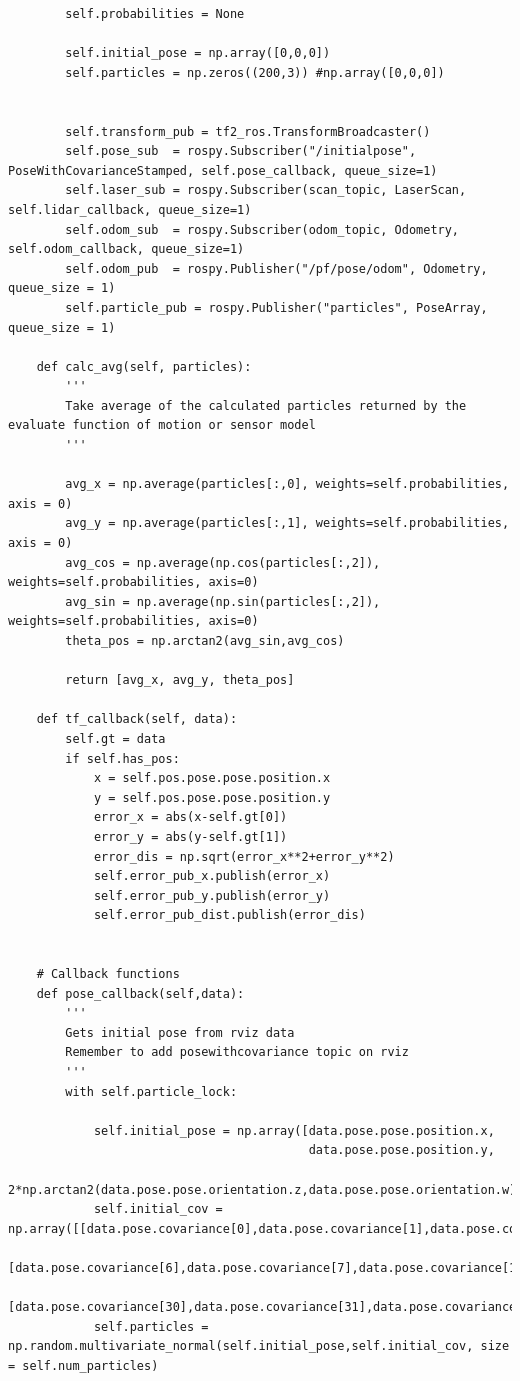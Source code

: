 \documentclass{article}
\begin{document}
{\begin{verbatim}
        self.probabilities = None

        self.initial_pose = np.array([0,0,0])
        self.particles = np.zeros((200,3)) #np.array([0,0,0])


        self.transform_pub = tf2_ros.TransformBroadcaster()
        self.pose_sub  = rospy.Subscriber("/initialpose", PoseWithCovarianceStamped, self.pose_callback, queue_size=1)
        self.laser_sub = rospy.Subscriber(scan_topic, LaserScan, self.lidar_callback, queue_size=1)
        self.odom_sub  = rospy.Subscriber(odom_topic, Odometry, self.odom_callback, queue_size=1)
        self.odom_pub  = rospy.Publisher("/pf/pose/odom", Odometry, queue_size = 1)
        self.particle_pub = rospy.Publisher("particles", PoseArray, queue_size = 1)

    def calc_avg(self, particles):
        '''
        Take average of the calculated particles returned by the evaluate function of motion or sensor model
        '''

        avg_x = np.average(particles[:,0], weights=self.probabilities, axis = 0)
        avg_y = np.average(particles[:,1], weights=self.probabilities, axis = 0)
        avg_cos = np.average(np.cos(particles[:,2]), weights=self.probabilities, axis=0)
        avg_sin = np.average(np.sin(particles[:,2]), weights=self.probabilities, axis=0)
        theta_pos = np.arctan2(avg_sin,avg_cos)

        return [avg_x, avg_y, theta_pos]
    
    def tf_callback(self, data):
        self.gt = data
        if self.has_pos:
            x = self.pos.pose.pose.position.x
            y = self.pos.pose.pose.position.y
            error_x = abs(x-self.gt[0])
            error_y = abs(y-self.gt[1])
            error_dis = np.sqrt(error_x**2+error_y**2)
            self.error_pub_x.publish(error_x)
            self.error_pub_y.publish(error_y)
            self.error_pub_dist.publish(error_dis)


    # Callback functions
    def pose_callback(self,data):
        '''
        Gets initial pose from rviz data
        Remember to add posewithcovariance topic on rviz
        '''
        with self.particle_lock:

            self.initial_pose = np.array([data.pose.pose.position.x,
                                          data.pose.pose.position.y,
                                          2*np.arctan2(data.pose.pose.orientation.z,data.pose.pose.orientation.w)])
            self.initial_cov = np.array([[data.pose.covariance[0],data.pose.covariance[1],data.pose.covariance[5]],
                                         [data.pose.covariance[6],data.pose.covariance[7],data.pose.covariance[11]],
                                         [data.pose.covariance[30],data.pose.covariance[31],data.pose.covariance[35]]])
            self.particles = np.random.multivariate_normal(self.initial_pose,self.initial_cov, size = self.num_particles)


\end{verbatim}}
\end{document}
